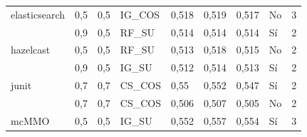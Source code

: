 \begin{table}[H]
{{\begin{tabular}{lllllllll}
elasticsearch                        & 0,5                               & 0,5                            & IG\_COS                                     & 0,518                                  & 0,519                               & 0,517                                 & No                                   & 3                                         \\
                        & 0,9                               & 0,5                            & RF\_SU                                      & 0,514                                  & 0,514                               & 0,514                                 & Sí                               & 2                                         \\
hazelcast                            & 0,5                               & 0,5                            & RF\_SU                                      & 0,513                                  & 0,518                               & 0,515                                 & No                                   & 2                                         \\
                            & 0,9                               & 0,5                            & IG\_SU                                      & 0,512                                  & 0,514                               & 0,513                                 & Sí                               & 2                                         \\
junit                                & 0,7                               & 0,7                            & CS\_COS                                     & 0,55                                   & 0,552                               & 0,547                                 & Sí                               & 2                                         \\
                                & 0,7                               & 0,7                            & CS\_COS                                     & 0,506                                  & 0,507                               & 0,505                                 & No                                   & 2                                         \\
mcMMO                                & 0,5                               & 0,5                            & IG\_SU                                      & 0,552                                  & 0,557                               & 0,554                                 & Sí                               & 3                                         \\

\end{tabular}}}
\end{table}
